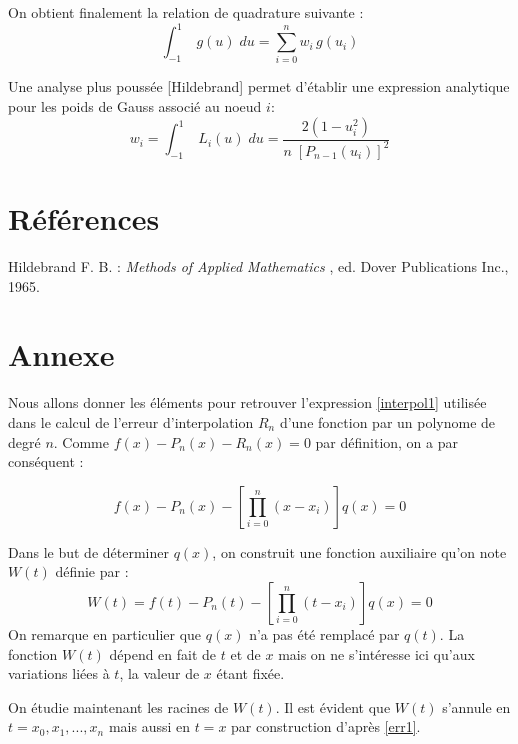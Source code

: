 \documentclass[a4paper, 10pt]{article}
\begin{document}
On obtient finalement la relation de quadrature suivante :
\begin{equation}
\int_{-1}^{1}\; g(u)\; du =   \sum_{i=0}^{n} w_i\, g(u_i) 
\label{quadrature}
\end{equation}

Une analyse plus poussée [Hildebrand] permet d'établir une expression analytique pour les poids de Gauss associé au noeud $i$:
\begin{equation}
w_i =  \int_{-1}^{1}\;  L_i(u) \; du = \frac{2 (1-u_i^2)}{n\; [P_{n-1}(u_i)]^2}
\label{poids}
\end{equation}


%

\vspace{-0.5cm}
\section{Références}

\noindent Hildebrand F. B. : {\it Methods of Applied Mathematics }, ed. Dover Publications Inc., 1965.

\newpage

\section{Annexe}

Nous allons donner les éléments pour retrouver l'expression \ref{interpol1} utilisée dans le calcul de l'erreur d'interpolation $R_n$ d'une fonction par un polynome de degré $n$.
Comme $f(x) - P_n(x)-R_n(x)=0$ par définition, on a par conséquent :

\begin{equation}
 f(x) - P_n(x) - \left[ \prod_{i=0}^n (x-x_i) \right] q(x) =0
\label{err1}
\end{equation}

Dans le but de déterminer $q(x)$, on construit une fonction auxiliaire qu'on note $W(t)$ définie par :
\begin{equation}
W(t) =  f(t) - P_n(t) - \left[ \prod_{i=0}^n (t-x_i) \right] q(x) =0
\label{aux1}
\end{equation}
On remarque en particulier que $q(x)$ n'a pas été remplacé  par $q(t)$. La fonction $W(t)$ dépend en fait de $t$ et de $x$ mais
on ne s'intéresse ici qu'aux variations liées à $t$, la valeur de $x$ étant fixée.

On étudie maintenant les racines de $W(t)$. Il est évident que $W(t)$ s'annule en $t=x_0, x_1, ... , x_n$ mais aussi en $t=x$ par construction
d'après \ref{err1}.
\end{document}
